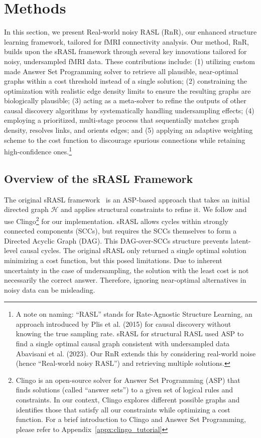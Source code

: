 \section{Methods}
In this section, we present Real-world noisy RASL (RnR), our enhanced structure learning framework, tailored for fMRI connectivity analysis. Our method, RnR, builds upon the sRASL framework through several key innovations tailored for noisy, undersampled fMRI data. These contributions include: (1) utilizing custom made Answer Set Programming solver to retrieve all plausible, near-optimal graphs within a cost threshold instead of a single solution; (2) constraining the optimization with realistic edge density limits to ensure the resulting graphs are biologically plausible; (3) acting as a meta-solver to refine the outputs of other causal discovery algorithms by systematically handling undersampling effects; (4) employing a prioritized, multi-stage process that sequentially matches graph density, resolves links, and orients edges; and (5) applying an adaptive weighting scheme to the cost function to discourage spurious connections while retaining high-confidence ones.\footnote{A note on naming: “RASL” stands for Rate-Agnostic Structure Learning, an approach introduced by Plis et al. (2015) for causal discovery without knowing the true sampling rate. sRASL for structural RASL used ASP to find a single optimal causal graph consistent with undersampled data Abavisani et al. (2023). Our RnR extends this by considering real-world noise (hence “Real-world noisy RASL”) and retrieving multiple solutions.}

\subsection{Overview of the sRASL Framework}


The original sRASL framework~\citep{abavisani2023grace} is an ASP-based approach that takes an initial directed graph $\mathcal{H}$ and applies structural constraints to refine it. We follow \cite{abavisani2023grace} and use Clingo\footnote{ Clingo is an open-source solver for Answer Set Programming (ASP) that finds solutions (called “answer sets”) to a given set of logical rules and constraints. In our context, Clingo explores different possible graphs and identifies those that satisfy all our constraints while optimizing a cost function. For a brief introduction to Clingo and Answer Set Programming, please refer to Appendix~\ref{appx:clingo_tutorial}} for our implementation. sRASL allows cycles within strongly connected components (SCCs), but requires the SCCs themselves to form a Directed Acyclic Graph (DAG). This DAG-over-SCCs structure prevents latent-level causal cycles. The original sRASL only returned a single optimal solution minimizing a cost function, but this posed limitations. Due to inherent uncertainty in the case of undersampling, the solution with the least cost is not necessarily the correct answer. Therefore, ignoring near-optimal alternatives in noisy data can be misleading. 


